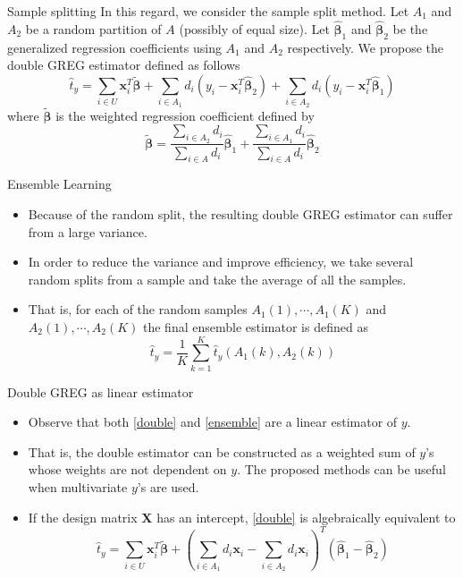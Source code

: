 \documentclass[usenames,dvipsnames, xcolor=table]{beamer}
\renewcommand{\bf}[1]{\boldsymbol{\mathbf{#1}}}
\newcommand{\pa}[1]{\left(#1\right)} %
\begin{document}
\begin{frame}{Sample splitting}
    In this regard, we consider the sample split method. Let $A_1$ and $A_2$ be a random partition of $A$ (possibly of equal size). Let $\hat {\bf \beta}_1$ and $\hat {\bf \beta}_2$ be the generalized regression coefficients using $A_1$ and $A_2$ respectively. We propose the double GREG estimator defined as follows
    \begin{equation}
  \hat t_y = \sum_{i \in U}\bf x_i^T\tilde {\bf \beta}  + \sum_{i \in A_1} d_i \pa{y_i - \bf x_i^T \hat{\bf \beta}_2} + \sum_{i \in A_2} d_i \pa{y_i - \bf x_i^T \hat{\bf \beta}_1} \label{double}        
    \end{equation}
  where $\tilde {\bf \beta}$ is the weighted regression coefficient defined by
  \begin{equation}
        \tilde {\bf \beta} = \frac{\sum_{i \in A_2}d_i}{\sum_{i \in A}d_i} \hat{\bf \beta}_1 + \frac{\sum_{i \in A_1}d_i}{\sum_{i \in A}d_i} \hat{\bf \beta}_2 
  \end{equation}
\end{frame}

\begin{frame}{Ensemble Learning}
    \begin{itemize}
        \item Because of the random split, the resulting double GREG estimator can suffer from a large variance.
        \item In order to reduce the variance and improve efficiency, we take several random splits from a sample and take the average of all the samples.
        \item That is, for each of the random samples $A_1(1), \cdots, A_1(K)$ and $A_2(1), \cdots, A_2(K)$ the final ensemble estimator is defined as
  \begin{equation}
      \hat t_y = \frac{1}{K}\sum_{k = 1}^K \hat t_y(A_1(k), A_2(k)) \label{ensemble}
  \end{equation}
    \end{itemize}
\end{frame}

\begin{frame}{Double GREG as linear estimator}
\begin{itemize}
    \item Observe that both \eqref{double} and \eqref{ensemble} are a linear estimator of $y$.
    \item That is, the double estimator can be constructed as a weighted sum of $y$'s whose weights are not dependent on $y$. The proposed methods can be useful when multivariate $y$'s are used.
    \item If the design matrix $\bf X$ has an intercept, \eqref{double} is algebraically equivalent to
  $$
  \hat t_y = \sum_{i \in U}\bf x_i^T\tilde {\bf \beta} + \pa{\sum_{i \in A_1} d_i \bf x_i - \sum_{i \in A_2} d_i \bf x_i}^T \pa{\hat{\bf \beta}_1 - \hat{\bf \beta}_2}
  $$
\end{itemize}
\end{frame}
\end{document}
